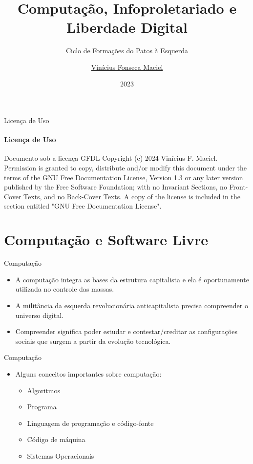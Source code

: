 \documentclass{beamer}
\title{Computação, Infoproletariado e Liberdade Digital}
\subtitle{Ciclo de Formações do Patos à Esquerda}
\author{\href{mailto:viniciusmacielf@gmail.com}{Vinícius Fonseca Maciel}}
\date{2023}
\begin{document}
\maketitle

\begin{frame}{Licença de Uso}
	\framesubtitle{Licença de Uso}
	\begin{block}{Documento sob a licença GFDL}
		Copyright (c)  2024  Vinícius F. Maciel. \\ Permission is granted to copy, distribute and/or modify this document under the terms of the GNU Free Documentation License, Version 1.3 or any later version published by the Free Software Foundation; with no Invariant Sections, no Front-Cover Texts, and no Back-Cover Texts. A copy of the license is included in the section entitled "GNU Free Documentation License".
	\end{block}
\end{frame}

\section{Computação e Software Livre}

\begin{frame}{Computação}
    \begin{itemize}
        \item A computação integra as bases da estrutura capitalista e ela é oportunamente utilizada no controle das massas.
        \item A militância da esquerda revolucionária anticapitalista precisa compreender o universo digital.
        \item Compreender significa poder estudar e contestar/creditar as configurações sociais que surgem a partir da evolução tecnológica.
    \end{itemize}
\end{frame}

\begin{frame}{Computação}
    \begin{itemize}
        \item Alguns conceitos importantes sobre computação:
        \begin{itemize}
            \item Algoritmos
            \item Programa
            \item Linguagem de programação e código-fonte
            \item Código de máquina
            \item Sistemas Operacionais
        \end{itemize}
    \end{itemize}
\end{frame}
\end{document}
